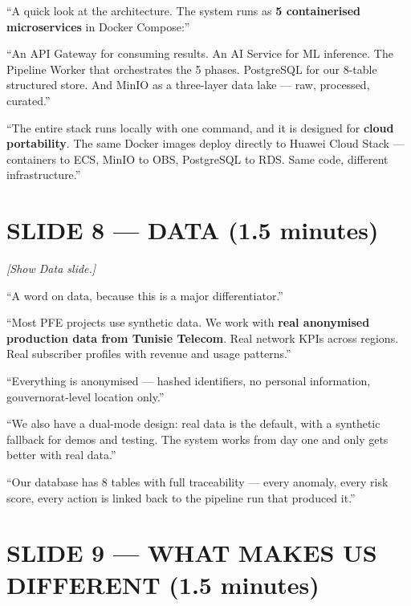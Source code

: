 \documentclass[12pt,a4paper]{article}
\newcommand{\stage}[1]{\par\textit{\color{stagedir}[#1]}\par}
\newcommand{\beat}{\par\vspace{0.4em}}
\newcommand{\keyword}[1]{\textbf{\color{aiviolet}#1}}
\newcommand{\emphasis}[1]{\textbf{\color{huaweired}#1}}
\begin{document}
``A quick look at the architecture. The system runs as \keyword{5 containerised
    microservices} in Docker Compose:''

\beat

``An API Gateway for consuming results. An AI Service for ML inference. The
Pipeline Worker that orchestrates the 5 phases. PostgreSQL for our 8-table
structured store. And MinIO as a three-layer data lake --- raw, processed,
curated.''

\beat

``The entire stack runs locally with one command, and it is designed for
\keyword{cloud portability}. The same Docker images deploy directly to Huawei
Cloud Stack --- containers to ECS, MinIO to OBS, PostgreSQL to RDS. Same code,
different infrastructure.''

\newpage
\section{SLIDE 8 --- DATA (1.5 minutes)}

\stage{Show Data slide.}

``A word on data, because this is a major differentiator.''

\beat

``Most PFE projects use synthetic data. We work with \emphasis{real anonymised
    production data from Tunisie Telecom}. Real network KPIs across regions. Real
subscriber profiles with revenue and usage patterns.''

\beat

``Everything is anonymised --- hashed identifiers, no personal information,
\mbox{gouvernorat-level} location only.''

\beat

``We also have a dual-mode design: real data is the default, with a synthetic
fallback for demos and testing. The system works from day one and only gets
better with real data.''

\beat

``Our database has 8 tables with full traceability --- every anomaly, every
risk score, every action is linked back to the pipeline run that produced it.''

\newpage
\section{SLIDE 9 --- WHAT MAKES US DIFFERENT (1.5 minutes)}
\end{document}
